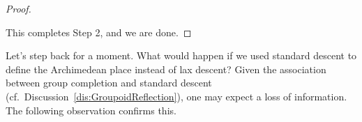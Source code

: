 \documentclass[a4paper, 11pt,reqno]{amsart}
\newcommand{\J}{\mathfrak{J}}
\newcommand{\K}{\mathfrak{K}}
\DeclareMathOperator*{\colim}{colim}
\begin{document}
\begin{proof}
\begin{enumerate}[label=(\alph*)]

	
	\end{enumerate}
	This completes Step 2, and we are done.
\end{proof}


Let's step back for a moment. What would happen if we used standard
descent to define the Archimedean place instead of lax descent? Given
the association between group completion and standard descent
(cf.~Discussion~\ref{dis:GroupoidReflection}), one may expect
a loss of information. The following
observation confirms this.
\end{document}

